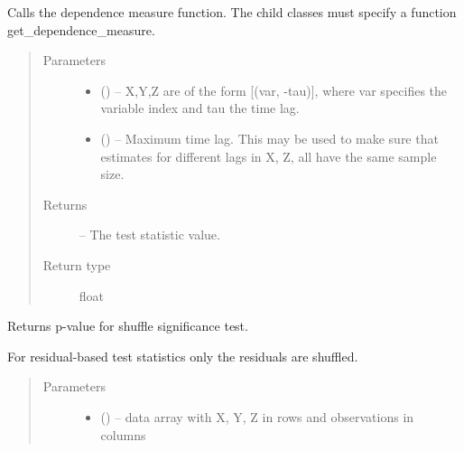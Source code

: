 \documentclass[letterpaper,10pt,english]{sphinxmanual}
\begin{document}
\begin{fulllineitems}
\begin{fulllineitems}
Calls the dependence measure function. The child classes must specify
a function get\_dependence\_measure.
\begin{quote}\begin{description}
\item[{Parameters}] \leavevmode\begin{itemize}
\item {} 
\sphinxstyleliteralstrong{ {[}}\sphinxstyleliteralstrong{}\sphinxstyleliteralstrong{, }\sphinxstyleliteralstrong{{]}}\sphinxstyleliteralstrong{} (\sphinxstyleliteralemphasis{,}\sphinxstyleliteralemphasis{}) -- X,Y,Z are of the form {[}(var, -tau){]}, where var specifies the
variable index and tau the time lag.

\item {} 
 (\sphinxstyleliteralemphasis{, }\sphinxstyleliteralemphasis{ (}\sphinxstyleliteralemphasis{)}\sphinxstyleliteralemphasis{}) -- Maximum time lag. This may be used to make sure that estimates for
different lags in X, Z, all have the same sample size.

\end{itemize}

\item[{Returns}] \leavevmode
{} -- The test statistic value.

\item[{Return type}] \leavevmode
float

\end{description}\end{quote}

\end{fulllineitems}


\begin{fulllineitems}
\label{\detokenize{index:tigramite.independence_tests.CondIndTest.get_shuffle_significance}}
Returns p-value for shuffle significance test.

For residual-based test statistics only the residuals are shuffled.
\begin{quote}\begin{description}
\item[{Parameters}] \leavevmode\begin{itemize}
\item {} 
 () -- data array with X, Y, Z in rows and observations in columns


\end{itemize}
\end{description}
\end{quote}
\end{fulllineitems}
\end{fulllineitems}
\end{document}
